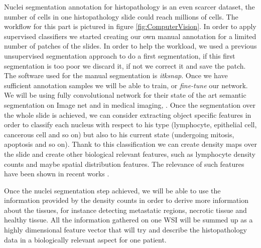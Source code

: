 \documentclass[a4paper,10pt,twocolumn]{article}
\begin{document}
Nuclei segmentation annotation for histopathology is an even scarcer dataset, the number of
 cells in one histopathology slide could reach millions of cells. The workflow for this part is
 pictured in figure \ref{fig:ComputerVision}. In order to apply supervised classifiers we started
 creating our own manual annotation for a limited number of patches of the slides. In order to 
 help the workload, we used a previous unsupervised segmentation approach to do a first 
 segmentation, if this first segmentation is too poor we discard it, if not we correct it and save 
 the patch. The software used for the manual segmentation is \textit{itksnap}. Once we have 
 sufficient annotation samples we will be able to train, or \textit{fine-tune} our network. We 
 will be using fully convolutional network for their state of the art semantic segmentation on  
 Image net \citep{long2015fcn} and in medical imaging, \citep{UNet}. Once the segmentation over the 
 whole slide is achieved, we can consider extracting object specific features in order to classify 
 each nucleus with respect to his type  (lymphocyte, epithelial cell, cancerous cell and so on) but 
 also to his current state (undergoing mitosis, apoptosis and so on). Thank to this classification we can create density maps over the slide and create other biological relevant features, such as lymphocyte density counts and maybe spatial distribution features. The relevance of such features have been shown in recent works \cite{yuan2012quantitative, lee2015supervised}. 
 
 
 Once the nuclei segmentation step achieved, we will be able to use the information provided by the density counts in order to derive more information about the tissues, for instance detecting metastatic regions, necrotic tissue and healthy tissue. All the information gathered on one WSI will be summed up as a highly dimensional feature vector that will try and describe the histopathology data in a biologically relevant aspect for one patient.
 
\end{document}
